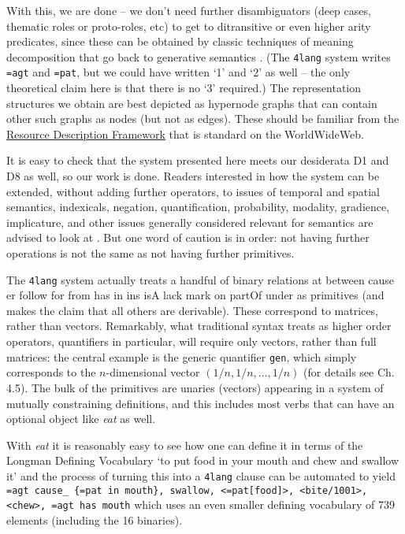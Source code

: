 \documentclass[output=paper,colorlinks=true,citecolor=brown]{langscibook}
\begin{document}
With this, we are done -- we don't need further disambiguators (deep cases,
thematic roles or proto-roles, etc) to get to ditransitive or even higher
arity predicates, since these can be obtained by classic techniques of meaning
decomposition that go back to generative semantics \citep{Kornai:2012}.  (The
\texttt{4lang} system writes \texttt{=agt} and \texttt{=pat}, but we could have
written `1' and `2' as well -- the only theoretical claim here is that there
is no `3' required.) The representation structures we obtain are best depicted
as hypernode graphs that can contain other such graphs as nodes (but not as
edges). These should be familiar from the
\href{https://en.wikipedia.org/wiki/Resource_Description_Framework}{Resource
  Description Framework} that is standard on the WorldWideWeb.

\bigskip\noindent It is easy to check that the system presented here meets our
desiderata D1 and D8 as well, so our work is done. Readers interested in how the
system can be extended, without adding further operators, to issues of
temporal and spatial semantics, indexicals, negation, quantification,
probability, modality, gradience, implicature, and other issues generally
considered relevant for semantics are advised to look at
\citet{Kornai:2022}. But one word of caution is in order: not having further
operations is not the same as not having further primitives.

The \texttt{4lang} system actually treats a handful of binary relations {\sc
  at between cause er follow for from has in ins isA lack mark on partOf
  under} as primitives (and makes the claim that all others are
derivable). These correspond to matrices, rather than vectors. Remarkably,
what traditional syntax treats as higher order operators, quantifiers in
particular, will require only vectors, rather than full matrices: the central
example is the generic quantifier \texttt{gen}, which simply corresponds to the
$n$-dimensional vector $(1/n,1/n,\ldots,1/n)$ (for details see
\cite{Kornai:2022} Ch. 4.5). The bulk of the primitives are unaries (vectors)
appearing in a system of mutually constraining definitions, and this includes
most verbs that can have an optional object like {\it eat} as well.

With {\it eat} it is reasonably easy to see how one can define it in terms of
the Longman Defining Vocabulary `to put food in your mouth and chew and
swallow it' and the process of turning this into a \texttt{4lang} clause can be
automated \citep{Recski:2016d} to yield \texttt{=agt cause\_ \{=pat in mouth\},
  swallow, <=pat[food]>, <bite/1001>, <chew>, =agt has mouth} which uses an
even smaller defining vocabulary of 739 elements (including the 16 binaries).
\end{document}
